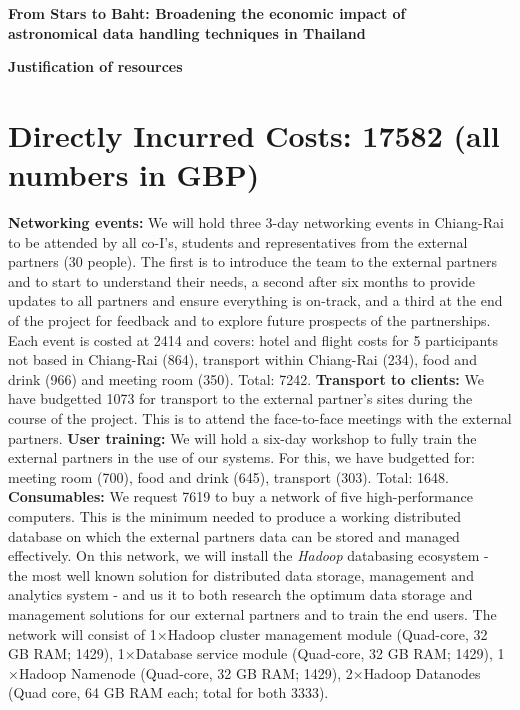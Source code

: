 \documentclass[11pt]{article}
\begin{document}
\setcounter{figure}{0}
\noindent
{\LARGE \bf From Stars to Baht: Broadening the economic impact of \\
astronomical data handling techniques in Thailand}

\vspace{3mm}
\noindent
{\LARGE \bf Justification of resources }
\vspace{-3mm}
\section{Directly Incurred Costs: 17582 (all numbers in GBP)}
\vspace{-3mm}
{\bf Networking events:} We will hold three 3-day networking events in Chiang-Rai to be attended by all co-I's, students and representatives from the external partners (30 people). The first is to introduce the team to the external partners and to start to understand their needs, a second after six months to provide updates to all partners and ensure everything is on-track, and a third at the end of the project for feedback and to explore future prospects of the partnerships. Each event is costed at 2414 and covers: hotel and flight costs for 5 participants not based in Chiang-Rai (864), transport within Chiang-Rai (234), food and drink (966) and meeting room (350). Total: 7242. {\bf Transport to clients:} We have budgetted 1073 for transport to the external partner's sites during the course of the project. This is to attend the face-to-face meetings with the external partners. {\bf User training:} We will hold a six-day workshop to fully train the external partners in the use of our systems. For this, we have budgetted for: meeting room (700), food and drink (645), transport (303). Total: 1648. {\bf Consumables:} We request 7619 to buy a network of five high-performance computers. This is the minimum needed to produce a working distributed database on which the external partners data can be stored and managed effectively. On this network, we will install the {\it Hadoop} databasing ecosystem - the most well known solution for distributed data storage, management and analytics system - and us it to both research the optimum data storage and management solutions for our external partners and to train the end users. The network will consist of 1$\times$Hadoop cluster management module (Quad-core, 32 GB RAM; 1429), 1$\times$Database service module (Quad-core, 32 GB RAM; 1429), 1$\times$Hadoop Namenode (Quad-core, 32 GB RAM; 1429), 2$\times$Hadoop Datanodes (Quad core, 64 GB RAM each; total for both 3333).
\end{document}
